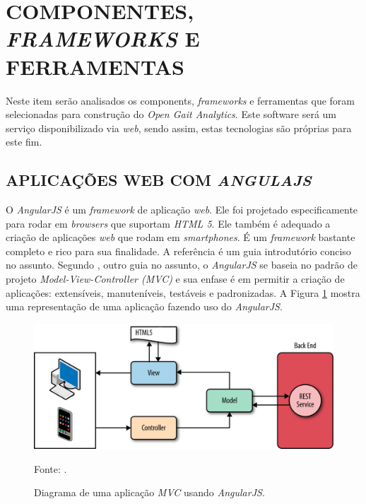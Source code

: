 \section[COMPONENTES, FRAMEWORKS E FERRAMENTAS]{COMPONENTES, \emph{FRAMEWORKS} E FERRAMENTAS}
Neste item serão analisados os components, \emph{frameworks} e ferramentas que foram selecionadas para construção do \emph{Open Gait Analytics}. 
Este software será um serviço disponibilizado via \emph{web}, sendo assim, estas tecnologias são próprias para este fim. 

\subsection{APLICAÇÕES WEB COM \emph{ANGULAJS}}
\label{angularjs}
O \emph{AngularJS} é um \emph{framework} de aplicação \emph{web}. 
Ele foi projetado especificamente para rodar em \emph{browsers} que suportam \emph{HTML 5}.
Ele também é adequado a criação de aplicações \emph{web} que rodam em \emph{smartphones}. 
É um \emph{framework} bastante completo e rico para sua finalidade. 
A referência  é um guia introdutório conciso no assunto.
 Segundo , outro guia no assunto, o \emph{AngularJS} se baseia no padrão de projeto \emph{Model-View-Controller (MVC)} e sua enfase é em permitir a criação de aplicações: extensíveis, manuteníveis, testáveis e padronizadas. 
A Figura \ref{angularjs_mvc} mostra uma representação de uma aplicação fazendo uso do \emph{AngularJS}.

\begin{figure}[ht]
	\centering
	\includegraphics[width=14cm]{figuras/angulajs_mvc.eps}
	\caption{Diagrama de uma aplicação \emph{MVC} usando \emph{AngularJS}.}
	\label{angularjs_mvc}
	\footnotesize Fonte:
	\cite{Williamson2015}.
\end{figure}

